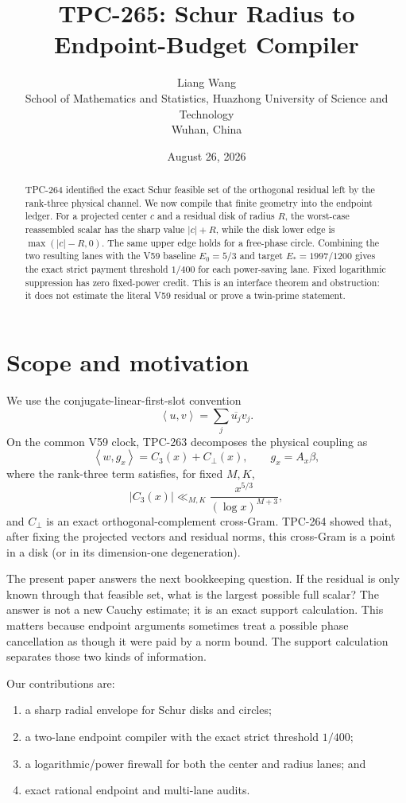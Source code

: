 \documentclass[11pt]{article}
\title{TPC-265: Schur Radius to Endpoint-Budget Compiler}
\author{Liang Wang\\
School of Mathematics and Statistics, Huazhong University of Science and Technology\\
Wuhan, China}
\date{August 26, 2026}
\theoremstyle{definition}
\newcommand{\ip}[2]{\left\langle #1,#2\right\rangle}
\begin{document}
\maketitle

\begin{abstract}
TPC-264 identified the exact Schur feasible set of the orthogonal residual left
by the rank-three physical channel.  We now compile that finite geometry into
the endpoint ledger.  For a projected center $c$ and a residual disk of radius
$R$, the worst-case reassembled scalar has the sharp value $|c|+R$, while the
disk lower edge is $\max(|c|-R,0)$.  The same upper edge holds for a free-phase
circle.  Combining the two resulting lanes with the V59 baseline
$E_0=5/3$ and target $E_*=1997/1200$ gives the exact strict payment threshold
$1/400$ for each power-saving lane.  Fixed logarithmic suppression has zero
fixed-power credit.  This is an interface theorem and obstruction: it does not
estimate the literal V59 residual or prove a twin-prime statement.
\end{abstract}

\section{Scope and motivation}

We use the conjugate-linear-first-slot convention
\[
 \ip{u}{v}=\sum_j\overline{u_j}v_j.
\]
On the common V59 clock, TPC-263 decomposes the physical coupling as
\[
 \ip{w}{g_x}=C_3(x)+C_\perp(x),\qquad g_x=A_x\beta,
\]
where the rank-three term satisfies, for fixed $M,K$,
\[
 |C_3(x)|\ll_{M,K}\frac{x^{5/3}}{(\log x)^{M+3}},
\]
and $C_\perp$ is an exact orthogonal-complement cross-Gram.  TPC-264 showed
that, after fixing the projected vectors and residual norms, this cross-Gram is
a point in a disk (or in its dimension-one degeneration).

The present paper answers the next bookkeeping question.  If the residual is
only known through that feasible set, what is the largest possible full scalar?
The answer is not a new Cauchy estimate; it is an exact support calculation.
This matters because endpoint arguments sometimes treat a possible phase
cancellation as though it were paid by a norm bound.  The support calculation
separates those two kinds of information.

Our contributions are:
\begin{enumerate}
 \item a sharp radial envelope for Schur disks and circles;
 \item a two-lane endpoint compiler with the exact strict threshold $1/400$;
 \item a logarithmic/power firewall for both the center and radius lanes; and
 \item exact rational endpoint and multi-lane audits.
\end{enumerate}
\end{document}
